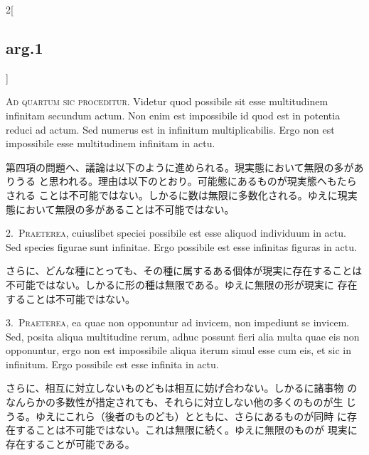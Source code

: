 \documentclass[paper=a4paper,fontsize=10pt,jafontsize=9pt,titlepage]{jlreq}
\begin{document}
{}
\setcounter{section}{4}
\setcounter{subsection}{0}

\begin{paracol}{2}[\subsection{arg.1}]

{\huge A}{\scshape d quartum sic proceditur}. Videtur quod possibile sit esse
 multitudinem infinitam secundum actum. Non enim est impossibile id quod
 est in potentia reduci ad actum. Sed numerus est in infinitum
 multiplicabilis. Ergo non est impossibile esse multitudinem infinitam
 in actu.

\switchcolumn

第四項の問題へ、議論は以下のように進められる。現実態において無限の多がありうる
 と思われる。理由は以下のとおり。可能態にあるものが現実態ヘもたらされる
 ことは不可能ではない。しかるに数は無限に多数化される。ゆえに現実
 態において無限の多があることは不可能ではない。


2.~{\scshape Praeterea}, cuiuslibet speciei possibile est esse aliquod
 individuum in actu. Sed species figurae sunt infinitae. Ergo possibile
 est esse infinitas figuras in actu.

\switchcolumn

さらに、どんな種にとっても、その種に属するある個体が現実に存在することは
 不可能ではない。しかるに形の種は無限である。ゆえに無限の形が現実に
 存在することは不可能ではない。


3.~{\scshape Praeterea}, ea quae non opponuntur ad invicem, non impediunt se
 invicem. Sed, posita aliqua multitudine rerum, adhuc possunt fieri alia
 multa quae eis non opponuntur, ergo non est impossibile aliqua iterum
 simul esse cum eis, et sic in infinitum. Ergo possibile est esse
 infinita in actu.

\switchcolumn

さらに、相互に対立しないものどもは相互に妨げ合わない。しかるに諸事物
 のなんらかの多数性が措定されても、それらに対立しない他の多くのものが生
 じうる。ゆえにこれら（後者のものども）とともに、さらにあるものが同時
 に存在することは不可能ではない。これは無限に続く。ゆえに無限のものが
 現実に存在することが可能である。


\end{paracol}
\end{document}
